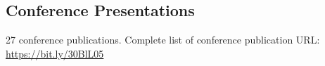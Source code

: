 \documentclass{my_cv}%
\begin{document}
\subsection{\faFilePowerpointO \hspace{0.5em}\bfseries Conference Presentations}
27 conference publications. Complete list of conference publication URL: \href{https://bit.ly/30BlL05}{https://bit.ly/30BlL05}

\end{document}

